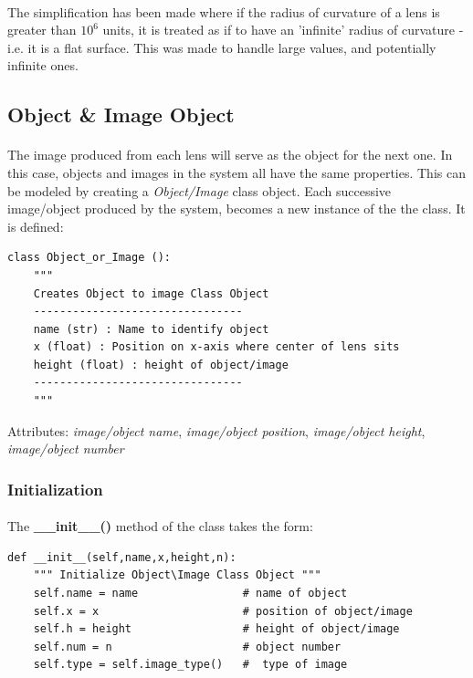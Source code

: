 \documentclass[12pt,letterpaper]{article}
\begin{document}
\paragraph*{}The simplification has been made where if the radius of curvature of a lens is greater than $10^{6}$ units, it is treated as if to have an 'infinite' radius of curvature - i.e. it is a flat surface. This was made to handle large values, and potentially infinite ones.


\subsection{Object \& Image Object}
\paragraph*{}The image produced from each lens will serve as the object for the next one. In this case, objects and images in the system all have the same properties. This can be modeled by creating a \textit{Object/Image} class object. Each successive image/object produced by the system, becomes a new instance of the the class. It is defined:
\begin{verbatim}
class Object_or_Image ():
    """
    Creates Object to image Class Object 
    --------------------------------
    name (str) : Name to identify object
    x (float) : Position on x-axis where center of lens sits
    height (float) : height of object/image
    --------------------------------
    """
\end{verbatim}
Attributes: \textit{image/object name}, \textit{image/object position},  \textit{image/object height}, \textit{image/object number}

\subsubsection*{Initialization}
\paragraph*{}The \textbf{\_\_init\_\_()} method of the class takes the form:	
\begin{verbatim}
def __init__(self,name,x,height,n):
    """ Initialize Object\Image Class Object """
    self.name = name                # name of object
    self.x = x                      # position of object/image
    self.h = height                 # height of object/image
    self.num = n                    # object number
    self.type = self.image_type()   #  type of image
\end{verbatim}
\end{document}
